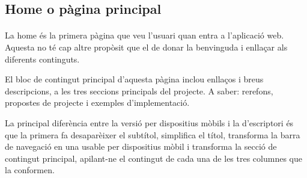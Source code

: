 \subsection{Home o pàgina principal}

    \paragraph{}
    La home és la primera pàgina que veu l'usuari quan entra a l'aplicació web. Aques\-ta no té cap altre propòsit que el de donar la benvinguda i enllaçar als diferents continguts.

    El bloc de contingut principal d’aquesta pàgina inclou enllaços i breus des\-crip\-cions, a les tres seccions principals del projecte. A saber: rerefons, propostes de projecte i exemples d'implementació.

    La principal diferència entre la versió per dispositius mòbils i la d'escriptori és que la primera fa desaparèixer el subtítol, simplifica el títol, transforma la barra de navegació en una usable per dispositius mòbil i transforma la secció de contingut principal, apilant-ne el contingut de cada una de les tres columnes que la conformen.
